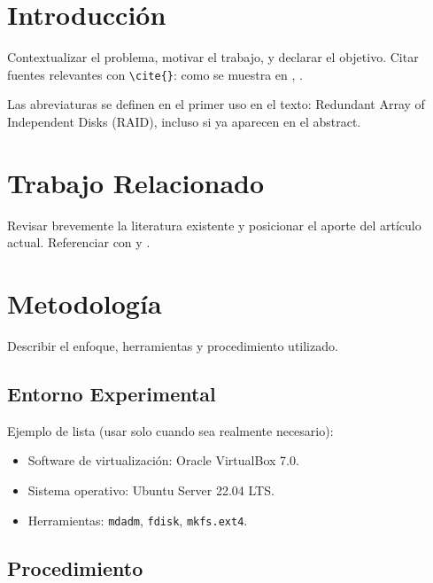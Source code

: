 \documentclass[conference]{IEEEtran}
\begin{document}
\section{Introducción}
\label{sec:intro}

Contextualizar el problema, motivar el trabajo, y declarar el objetivo.
Citar fuentes relevantes con \verb|\cite{}|: como se muestra en
\cite{haykin2009neural}, \cite{smith2020example}.

Las abreviaturas se definen en el primer uso en el texto:
Redundant Array of Independent Disks (RAID), incluso si ya aparecen en el
abstract.

\section{Trabajo Relacionado}
\label{sec:related}

Revisar brevemente la literatura existente y posicionar el aporte del
artículo actual. Referenciar con \cite{jones2021analysis} y
\cite{doe2022framework}.

\section{Metodología}
\label{sec:methodology}

Describir el enfoque, herramientas y procedimiento utilizado.

\subsection{Entorno Experimental}
\label{sec:environment}

Ejemplo de lista (usar solo cuando sea realmente necesario):
\begin{itemize}
  \item Software de virtualización: Oracle VirtualBox 7.0.
  \item Sistema operativo: Ubuntu Server 22.04 LTS.
  \item Herramientas: \texttt{mdadm}, \texttt{fdisk}, \texttt{mkfs.ext4}.
\end{itemize}

\subsection{Procedimiento}
\label{sec:procedure}
\end{document}
